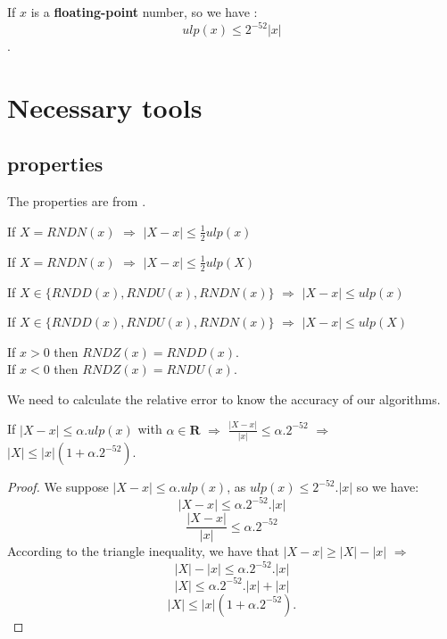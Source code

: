 \begin{coroll}
If $x$ is a \textbf{floating-point} number, so we have :
$$ulp(x) \le 2^{-52} \lvert x \rvert$$.
\end{coroll}
\newpage

\section{Necessary tools}

\subsection{properties}
The properties are from \cite{muller2010handbook}.

\begin{prope}\label{prop:1} 
 If $X = RNDN(x)$ $\Rightarrow$ $\vert X - x \rvert \le \frac{1}{2}ulp(x)$
\end{prope}

\begin{prope} \label{prop:2} 
If $X = RNDN(x)$ $\Rightarrow$ $\vert X - x \rvert \le \frac{1}{2}ulp(X)$
\end{prope}

\begin{prope} \label{prop:3} 
If $X \in \{ RNDD(x), RNDU(x), RNDN(x)\} $ $\Rightarrow$ $\vert X - x \rvert \le ulp(x)$
\end{prope}

\begin{prope} \label{prop:4}
If $X \in \{ RNDD(x), RNDU(x), RNDN(x)\} $ $\Rightarrow$ $\vert X - x \rvert \le ulp(X)$
\end{prope}

\begin{prope}
If $x>0$ then $RNDZ(x)=RNDD(x)$.\\
If $x<0$ then $RNDZ(x)=RNDU(x)$.
\end{prope}
We need to calculate the relative error to know the accuracy of
our algorithms.\\

\begin{coroll}  
If $\lvert X - x \rvert \le \alpha. ulp(x)$  with $\alpha \in   \mathbf{R}$ $\Rightarrow$ $\frac{\lvert X - x \rvert}{\lvert x \rvert} \le \alpha.2^{-52}$
$\Rightarrow$\\ 
$\lvert X \rvert \le \lvert x \rvert (1 + \alpha.2^{-52})$.
\end{coroll}

\begin{proof} \color{-yellow}
We suppose $\lvert X - x \rvert \le \alpha. ulp(x)$,  as $ulp(x) \le 2^{-52}.\lvert x \rvert$ so we have:
$$\lvert X - x \rvert \le \alpha.2^{-52}.\lvert x \rvert$$
$$\frac{\lvert X - x \rvert}{\lvert x \rvert} \le \alpha.2^{-52}$$
According to the triangle inequality, we have that $\lvert X - x \rvert \ge \lvert X \rvert - \lvert x \rvert$ $\Rightarrow$
$$\lvert X \rvert - \lvert x \rvert \le \alpha.2^{-52}.\lvert x \rvert$$
$$\lvert X \rvert   \le \alpha.2^{-52}.\lvert x \rvert + \lvert x \rvert$$
$$\lvert X \rvert   \le \lvert x \rvert (1+\alpha.2^{-52}).$$
\end{proof}

